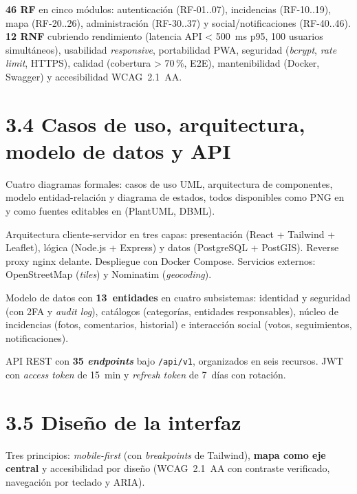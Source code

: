 \textbf{46 RF} en cinco módulos: autenticación (RF-01..07), incidencias (RF-10..19), mapa (RF-20..26), administración (RF-30..37) y social/notificaciones (RF-40..46). \textbf{12 RNF} cubriendo rendimiento (latencia API < 500~ms p95, 100 usuarios simultáneos), usabilidad \textit{responsive}, portabilidad PWA, seguridad (\textit{bcrypt}, \textit{rate limit}, HTTPS), calidad (cobertura > 70\,\%, E2E), mantenibilidad (Docker, Swagger) y accesibilidad WCAG~2.1~AA.

\section*{3.4 Casos de uso, arquitectura, modelo de datos y API}

Cuatro diagramas formales: casos de uso UML, arquitectura de componentes, modelo entidad-relación y diagrama de estados, todos disponibles como PNG en  y como fuentes editables en  (PlantUML, DBML).

Arquitectura cliente-servidor en tres capas: presentación (React + Tailwind + Leaflet), lógica (Node.js + Express) y datos (PostgreSQL + PostGIS). Reverse proxy nginx delante. Despliegue con Docker Compose. Servicios externos: OpenStreetMap (\textit{tiles}) y Nominatim (\textit{geocoding}).

Modelo de datos con \textbf{13~entidades} en cuatro subsistemas: identidad y seguridad (con 2FA y \textit{audit log}), catálogos (categorías, entidades responsables), núcleo de incidencias (fotos, comentarios, historial) e interacción social (votos, seguimientos, notificaciones).

API REST con \textbf{35 \textit{endpoints}} bajo \texttt{/api/v1}, organizados en seis recursos. JWT con \textit{access token} de 15~min y \textit{refresh token} de 7~días con rotación.

\section*{3.5 Diseño de la interfaz}

Tres principios: \textit{mobile-first} (con \textit{breakpoints} de Tailwind), \textbf{mapa como eje central} y accesibilidad por diseño (WCAG~2.1~AA con contraste verificado, navegación por teclado y ARIA).

